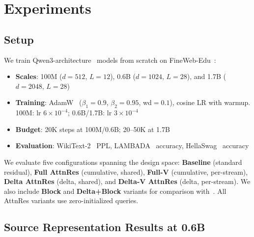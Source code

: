 \documentclass{article}
\begin{document}
\section{Experiments}
\label{sec:experiments}

\subsection{Setup}

We train Qwen3-architecture~\citep{qwen2025qwen3} models from scratch on FineWeb-Edu~\citep{penedo2024fineweb}:
\begin{itemize}
    \item \textbf{Scales}: 100M ($d{=}512$, $L{=}12$), 0.6B ($d{=}1024$, $L{=}28$), and 1.7B ($d{=}2048$, $L{=}28$)
    \item \textbf{Training}: AdamW~\citep{loshchilov2019adamw} ($\beta_1{=}0.9$, $\beta_2{=}0.95$, wd${=}0.1$), cosine LR with warmup. 100M: lr $6{\times}10^{-4}$; 0.6B/1.7B: lr $3{\times}10^{-4}$
    \item \textbf{Budget}: 20K steps at 100M/0.6B; 20--50K at 1.7B
    \item \textbf{Evaluation}: WikiText-2~\citep{merity2017wikitext} PPL, LAMBADA~\citep{paperno2016lambada} accuracy, HellaSwag~\citep{zellers2019hellaswag} accuracy
\end{itemize}

We evaluate five configurations spanning the design space: \textbf{Baseline} (standard residual), \textbf{Full AttnRes} (cumulative, shared), \textbf{Full-V} (cumulative, per-stream), \textbf{Delta AttnRes} (delta, shared), and \textbf{Delta-V AttnRes} (delta, per-stream). We also include \textbf{Block} and \textbf{Delta+Block} variants for comparison with~\citet{kimi2025attention}. All AttnRes variants use zero-initialized queries.

\subsection{Source Representation Results at 0.6B}
\end{document}
